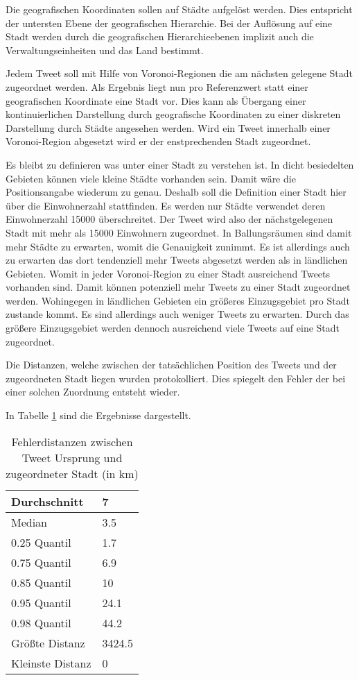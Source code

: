 					Die geografischen Koordinaten sollen auf Städte aufgelöst werden.
					Dies entspricht der untersten Ebene der geografischen Hierarchie.
					Bei der Auflösung auf eine Stadt werden durch die geografischen Hierarchieebenen implizit auch die Verwaltungseinheiten und das Land bestimmt.

					Jedem Tweet soll mit Hilfe von Voronoi-Regionen die am nächsten gelegene Stadt zugeordnet werden.
					Als Ergebnis liegt nun pro Referenzwert statt einer geografischen Koordinate eine Stadt vor.
					Dies kann als Übergang einer kontinuierlichen Darstellung durch geografische Koordinaten zu einer diskreten Darstellung durch Städte angesehen werden. 
					Wird ein Tweet innerhalb einer Voronoi-Region abgesetzt wird er der enstprechenden Stadt zugeordnet.

					Es bleibt zu definieren was unter einer Stadt zu verstehen ist.
					In dicht besiedelten Gebieten können viele kleine Städte vorhanden sein. 
					Damit wäre die Positionsangabe wiederum zu genau.
					Deshalb soll die Definition einer Stadt hier über die Einwohnerzahl stattfinden.
					Es werden nur Städte verwendet deren Einwohnerzahl 15000 überschreitet.
					Der Tweet wird also der nächstgelegenen Stadt mit mehr als 15000 Einwohnern zugeordnet.
					In Ballungsräumen sind damit mehr Städte zu erwarten, womit die Genauigkeit zunimmt.
					Es ist allerdings auch zu erwarten das dort tendenziell mehr Tweets abgesetzt werden als in ländlichen Gebieten.
					Womit in jeder Voronoi-Region zu einer Stadt ausreichend Tweets vorhanden sind.
					Damit können potenziell mehr Tweets zu einer Stadt zugeordnet werden.
					Wohingegen in ländlichen Gebieten ein größeres Einzugsgebiet pro Stadt zustande kommt.
					Es sind allerdings auch weniger Tweets zu erwarten. 
					Durch das größere Einzugsgebiet werden dennoch ausreichend viele Tweets auf eine Stadt zugeordnet. 

					Die Distanzen, welche zwischen der tatsächlichen Position des Tweets und der zugeordneten Stadt liegen wurden protokolliert. 
					Dies spiegelt den Fehler der bei einer solchen Zuordnung entsteht wieder.

					In Tabelle \ref{tab:distances} sind die Ergebnisse dargestellt.

					\begin{table}[h]
					\centering
					\caption{Fehlerdistanzen zwischen Tweet Ursprung und zugeordneter Stadt (in km)}
					\label{tab:distances}
					\begin{tabular}{|l|l|}
					Durchschnitt & 7      \\ \hline
					Median       & 3.5    \\ \hline
					0.25 Quantil & 1.7    \\ \hline
					0.75 Quantil & 6.9    \\ \hline
					0.85 Quantil & 10     \\ \hline
					0.95 Quantil & 24.1   \\ \hline
					0.98 Quantil & 44.2   \\ \hline
					Größte Distanz      & 3424.5 \\ \hline
					Kleinste Distanz     & 0     
					\end{tabular}
					\end{table}

